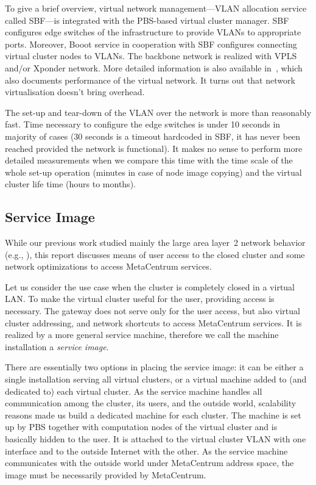 \documentclass[a4paper]{article}
\begin{document}
To give a brief overview, virtual network management---VLAN allocation
service called SBF---is
integrated with the PBS-based virtual cluster manager. SBF configures
edge switches of the infrastructure to provide VLANs to appropriate ports.
Moreover, Booot service in cooperation with SBF configures connecting
virtual cluster nodes to VLANs. The backbone network is realized with VPLS
and/or Xponder network. More detailed information is
also available in~\cite{virtcloud-techrep}, which also documents
performance of the virtual network. It turns out that network
virtualisation doesn't bring overhead.

The set-up and tear-down of the VLAN over the network is more than
reasonably fast. Time necessary to configure the edge switches is under 10
seconds in majority of cases (30 seconds is a timeout hardcoded in SBF, it
has never been reached provided the network is functional). It
makes no sense to perform more detailed measurements when we compare this
time with the time scale of the whole set-up operation (minutes in case of
node image copying) and the virtual cluster life time (hours to months).

\subsection{Service Image}

While our previous work studied mainly the large area layer~2
network behavior (e.g.,
\cite{sbf}), this report discusses means of user access to the closed
cluster and some network optimizations to access MetaCentrum services.

Let us consider the use case when the cluster is completely closed in a
virtual LAN. To make the virtual cluster useful for the user, providing
access is necessary. The gateway does not serve only for the user access,
but also virtual cluster addressing, and network shortcuts to access
MetaCentrum services.
It is realized by a more general 
service machine, therefore we call the machine
installation a \emph{service image}.

There are essentially two options in
placing the service image: it can be either a single installation serving
all virtual clusters, or a virtual machine added to (and dedicated to) each
virtual cluster. As the service machine handles all communication among
the cluster, its users, and the outside world, scalability reasons made us
build a dedicated machine for each cluster. The machine is set up by PBS
together with computation nodes of the virtual cluster
and is basically hidden to the user. It is attached to the virtual cluster
VLAN
with one interface and to the outside Internet with the other.
As the service machine communicates with the outside world under MetaCentrum
address space, the image must be necessarily provided by MetaCentrum.
\end{document}
